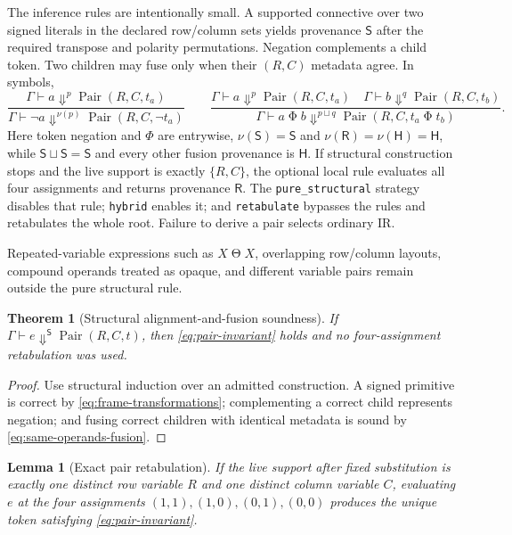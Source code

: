 \documentclass[11pt]{article}
\newtheorem{theorem}{Theorem}
\newtheorem{lemma}{Lemma}
\begin{document}
The inference rules are intentionally small. A supported connective over two
signed literals in the declared row/column sets yields provenance
$\mathsf{S}$ after the required transpose and polarity permutations. Negation
complements a child token. Two children may fuse only when their $(R,C)$
metadata agree. In symbols,
\begin{equation}
 \frac{\Gamma\vdash a\Downarrow^p\operatorname{Pair}(R,C,t_a)}
      {\Gamma\vdash\neg a\Downarrow^{\nu(p)}
       \operatorname{Pair}(R,C,\neg t_a)}
 \qquad
 \frac{\Gamma\vdash a\Downarrow^p\operatorname{Pair}(R,C,t_a)\quad
       \Gamma\vdash b\Downarrow^q\operatorname{Pair}(R,C,t_b)}
      {\Gamma\vdash a\mathbin{\Phi}b\Downarrow^{p\sqcup q}
       \operatorname{Pair}(R,C,t_a\mathbin{\Phi}t_b)}.
 \label{eq:pair-rules}
\end{equation}
Here token negation and $\Phi$ are entrywise, $\nu(\mathsf S)=\mathsf S$ and
$\nu(\mathsf R)=\nu(\mathsf H)=\mathsf H$, while
$\mathsf S\sqcup\mathsf S=\mathsf S$ and every other fusion provenance is
$\mathsf H$. If structural construction stops and the live support is exactly
$\{R,C\}$, the optional local rule evaluates all four assignments and returns
provenance $\mathsf R$. The \texttt{pure\_structural} strategy disables that
rule; \texttt{hybrid} enables it; and \texttt{retabulate} bypasses the rules
and retabulates the whole root. Failure to derive a pair selects ordinary IR.

Repeated-variable expressions such as $X\mathbin{\Theta}X$, overlapping
row/column layouts, compound operands treated as opaque, and different
variable pairs remain outside the pure structural rule.

\begin{theorem}[Structural alignment-and-fusion soundness]
If $\Gamma\vdash e\Downarrow^{\mathsf S}\operatorname{Pair}(R,C,t)$, then
\eqref{eq:pair-invariant} holds and no four-assignment retabulation was used.
\end{theorem}

\begin{proof}
Use structural induction over an admitted construction. A signed primitive is
correct by \eqref{eq:frame-transformations}; complementing a correct child
represents negation; and fusing correct children with identical metadata is
sound by \eqref{eq:same-operands-fusion}.
\end{proof}

\begin{lemma}[Exact pair retabulation]
If the live support after fixed substitution is exactly one distinct row
variable $R$ and one distinct column variable $C$, evaluating $e$ at the four
assignments $(1,1),(1,0),(0,1),(0,0)$ produces the unique token satisfying
\eqref{eq:pair-invariant}.
\end{lemma}
\end{document}
